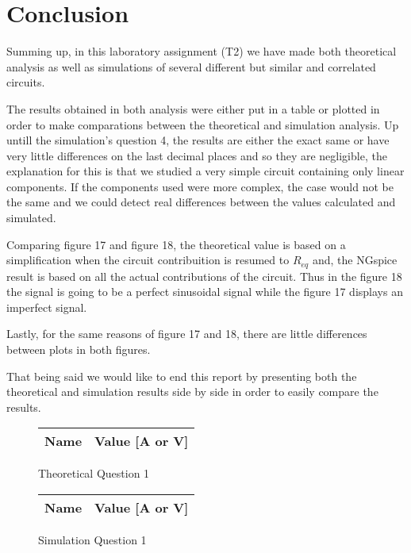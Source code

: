 \section{Conclusion}
\label{sec:conclusion}

Summing up, in this laboratory assignment (T2) we have made both theoretical analysis as well as simulations of several different but similar and correlated circuits. \par
The results obtained in both analysis were either put in a table or plotted in order to make comparations between the theoretical and simulation analysis.
Up untill the simulation's question 4, the results are either the exact same or have very little differences on the last decimal places and so they are negligible, the explanation for this is that we studied a very simple circuit containing only linear components. If the components used were more complex, the case would not be the same and we could detect real differences between the values calculated and simulated. \par
Comparing figure 17 and figure 18, the theoretical value is based on a simplification when the circuit contribuition is resumed to $R_{eq}$ and, the NGspice result is based on all the actual contributions of the circuit. Thus in the figure 18 the signal is going to be a perfect sinusoidal signal while the figure 17 displays an imperfect signal. \par
Lastly, for the same reasons of figure 17 and 18, there are little differences between plots in both figures. \par
That being said we would like to end this report by presenting both the theoretical and simulation results side by side in order to easily compare the results. \par

\begin{figure}[H]
      \centering
      \begin{tabular}{ | c | c | }
      \hline    
      {\bf Name} & {\bf Value [A or V]} \\ \hline
      
      \hline
      \end{tabular}
      \caption{Theoretical Question 1}
    \endminipage\hfill
      \centering
      \begin{tabular}{ | c | c | }
      \hline    
      {\bf Name} & {\bf Value [A or V]} \\ \hline
      
      \end{tabular}
      \caption{Simulation Question 1}
    \endminipage\hfill
\end{figure}

